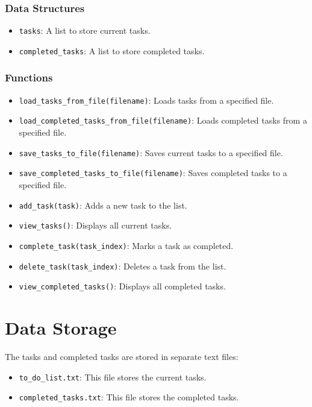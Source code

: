 \documentclass[12pt,a4paper]{report}
\begin{document}
\subsubsection{Data Structures}
\begin{itemize}
    \item \texttt{tasks}: A list to store current tasks.
    \item \texttt{completed\_tasks}: A list to store completed tasks.
\end{itemize}

\subsubsection{Functions}
\begin{itemize}
    \item \texttt{load\_tasks\_from\_file(filename)}: Loads tasks from a specified file.
    \item \texttt{load\_completed\_tasks\_from\_file(filename)}: Loads completed tasks from a specified file.
    \item \texttt{save\_tasks\_to\_file(filename)}: Saves current tasks to a specified file.
    \item \texttt{save\_completed\_tasks\_to\_file(filename)}: Saves completed tasks to a specified file.
    \item \texttt{add\_task(task)}: Adds a new task to the list.
    \item \texttt{view\_tasks()}: Displays all current tasks.
    \item \texttt{complete\_task(task\_index)}: Marks a task as completed.
    \item \texttt{delete\_task(task\_index)}: Deletes a task from the list.
    \item \texttt{view\_completed\_tasks()}: Displays all completed tasks.
\end{itemize}

\section{Data Storage}
The tasks and completed tasks are stored in separate text files:
\begin{itemize}
    \item \texttt{to\_do\_list.txt}: This file stores the current tasks.
    \item \texttt{completed\_tasks.txt}: This file stores the completed tasks.
\end{itemize}
\end{document}
